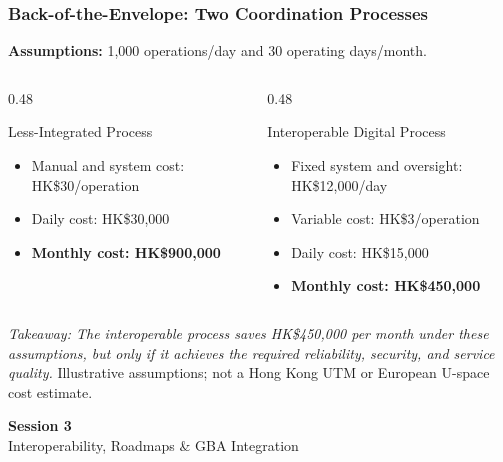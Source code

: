 \documentclass{beamer}
\begin{document}
\begin{frame}[t,shrink=11]
\frametitle{Back-of-the-Envelope: Two Coordination Processes}
\textbf{Assumptions:} 1,000 operations/day and 30 operating days/month.
\begin{columns}[T]
\begin{column}{0.48\textwidth}\begin{block}{Less-Integrated Process}
\begin{itemize}
\item Manual and system cost: HK\$30/operation
\item Daily cost: HK\$30,000
\item \textbf{Monthly cost: HK\$900,000}
\end{itemize}\end{block}\end{column}
\begin{column}{0.48\textwidth}\begin{block}{Interoperable Digital Process}
\begin{itemize}
\item Fixed system and oversight: HK\$12,000/day
\item Variable cost: HK\$3/operation
\item Daily cost: HK\$15,000
\item \textbf{Monthly cost: HK\$450,000}
\end{itemize}\end{block}\end{column}
\end{columns}
\textit{Takeaway: The interoperable process saves HK\$450,000 per month under these assumptions, but only if it achieves the required reliability, security, and service quality.}
\vfill{\tiny Illustrative assumptions; not a Hong Kong UTM or European U-space cost estimate.}
\end{frame}

\begin{frame}[c]
  \begin{center}
    \huge\color{cuhkpurple}\textbf{Session 3}\\
    \vspace{0.5cm}
    \Large Interoperability, Roadmaps \& GBA Integration
  \end{center}
\end{frame}
\end{document}
